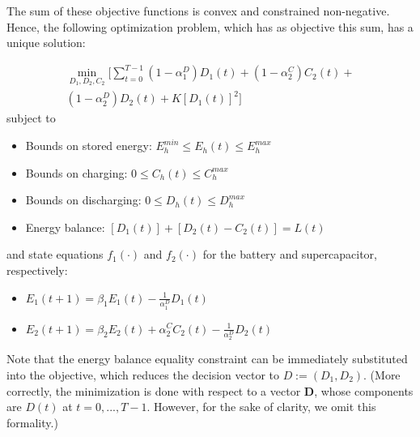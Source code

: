 \documentclass[conference]{IEEEtran}
\begin{document}
The sum of these objective functions is convex and constrained non-negative. Hence, the following optimization problem, which has as objective this sum, has a unique solution:

\begin{multline} \label{eq:initCostFnc}
    \min_{D_{1},D_{2},C_{2}}\Biggl[\sum_{t=0}^{T-1}
	(1-\alpha_{1}^{D})D_{1}(t)+
	(1-\alpha_{2}^{C})C_{2}(t)+\\
	(1-\alpha_{2}^{D})D_{2}(t)+
	K\left[D_{1}(t)\right]^{2}
	\Biggr]\end{multline}
subject to
\begin{itemize}
    \item Bounds on stored energy: 
	\begin{math}E_{h}^{min}\leq E_{h}(t)\leq E_{h}^{max}\end{math}
	\item Bounds on charging:
	\begin{math}0\leq C_{h}(t)\leq C_{h}^{max}\end{math}
	\item Bounds on discharging:
	\begin{math}0\leq D_{h}(t)\leq D_{h}^{max}\end{math}
	\item Energy balance:
	\begin{math}\left[D_{1}(t)\right] + \left[D_{2}(t) - C_{2}(t)\right] = L(t)\end{math}
\end{itemize}
and state equations $f_{1}(\cdot)$ and $f_{2}(\cdot)$ for the battery and supercapacitor, respectively:
\begin{itemize}
    \item \begin{math}E_{1}(t+1)=\beta_{1}E_{1}(t)-\frac{1}{\alpha_{1}^{D}}D_{1}(t)\end{math}
    \item \begin{math}E_{2}(t+1)=\beta_{2}E_{2}(t)+\alpha_{2}^{C}C_{2}(t)-\frac{1}{\alpha_{2}^{D}}D_{2}(t)\end{math}\newline
\end{itemize} Note that the energy balance equality constraint can be immediately substituted into the objective, which reduces the decision vector to $D:=(D_{1},D_{2})$. (More correctly, the minimization is done with respect to a vector $\textbf{D}$, whose components are $D(t)$ at $t=0,...,T-1$.  However, for the sake of clarity, we omit this formality.)
\end{document}
